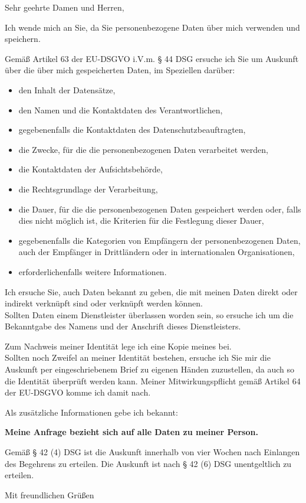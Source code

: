 \documentclass[%
  fontsize=12pt, %
  version=last%
]{scrlttr2}
\begin{document}
\begin{letter}
{
  \ziel{}
}

\opening{Sehr geehrte Damen und Herren,}
Ich wende mich an Sie, da Sie personenbezogene Daten über mich verwenden und speichern.\par
Gemäß Artikel 63 der EU-DSGVO i.V.m. § 44 DSG ersuche ich Sie um Auskunft über die über mich gespeicherten Daten, im Speziellen darüber:
\begin{itemize}
  \item den Inhalt der Datensätze,
  \item den Namen und die Kontaktdaten des Verantwortlichen,
  \item gegebenenfalls die Kontaktdaten des Datenschutzbeauftragten,
  \item die Zwecke, für die die personenbezogenen Daten verarbeitet werden,
  \item die Kontaktdaten der Aufsichtsbehörde,
  \item die Rechtsgrundlage der Verarbeitung,
  \item die Dauer, für die die personenbezogenen Daten gespeichert werden oder, falls dies nicht möglich ist, die Kriterien für die Festlegung dieser Dauer,
  \item gegebenenfalls die Kategorien von Empfängern der personenbezogenen Daten, auch der Empfänger in Drittländern oder in internationalen Organisationen,
  \item erforderlichenfalls weitere Informationen.
\end{itemize}

Ich ersuche Sie, auch Daten bekannt zu geben, die mit meinen Daten direkt oder indirekt verknüpft sind oder verknüpft werden können.\\
Sollten Daten einem Dienstleister überlassen worden sein, so ersuche ich um die Bekanntgabe des Namens und der Anschrift dieses Dienstleisters.\par
Zum Nachweis meiner Identität lege ich eine Kopie meines \ausweis{} bei.\\
Sollten noch Zweifel an meiner Identität bestehen, ersuche ich Sie mir die Auskunft per eingeschriebenem Brief zu eigenen Händen zuzustellen, da auch so die Identität überprüft werden kann.
Meiner Mitwirkungspflicht gemäß Artikel 64 der EU-DSGVO komme ich damit nach.\par

\ifx \zusatzinfo \undefined
\else
Als zusätzliche Informationen gebe ich bekannt:\\
\zusatzinfo{}
\fi

\textbf{Meine Anfrage bezieht sich auf alle Daten zu meiner Person.}\par

Gemäß § 42 (4) DSG ist die Auskunft innerhalb von vier Wochen nach Einlangen des Begehrens zu erteilen. Die Auskunft ist nach § 42 (6) DSG unentgeltlich zu erteilen.
\closing{Mit freundlichen Grüßen}


\end{letter}
\end{document}
